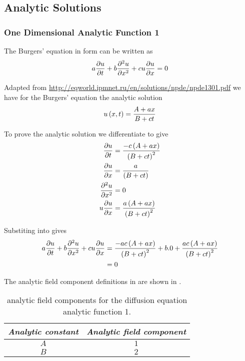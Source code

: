 \subsection{Analytic Solutions}

\subsubsection{One Dimensional Analytic Function 1}

The \oned Burgers' equation in \OpenCMISS form can be written as
\begin{equation}
  a\delby{u}{t}+b\deltwosqby{u}{x}+cu\delby{u}{x}=0
  \label{eqn:OpenCMISSBurgerEquationOneDim}
\end{equation}

Adapted from \url{http://eqworld.ipmnet.ru/en/solutions/npde/npde1301.pdf} we
have for the \oned Burgers' equation the analytic solution
\begin{equation}
  \fnof{u}{x,t}=\dfrac{A+ax}{B+ct}
  \label{eqn:AnalyticBurgersEquationOneDim1}
\end{equation}

To prove the analytic solution we differentiate  to give
\begin{align}
  \delby{u}{t} &= \dfrac{-c\pbrac{A+ax}}{\pbrac{B+ct}^{2}} \\
  \delby{u}{x} &= \dfrac{a}{\pbrac{B+ct}} \\
  \deltwosqby{u}{x} &= 0 \\
  u\delby{u}{x} &= \dfrac{a\pbrac{A+ax}}{\pbrac{B+ct}^{2}} \\
  \label{eqn:AnalyticBurgersEquationOneDim1Derivatives}
\end{align}

Substiting  into  gives
\begin{align}
  a \dfrac{\partial u}{\partial t} +b \dfrac{\partial^{2} u}{\partial {x}^{2}} +cu \dfrac{\partial u}{\partial x}  &=
  \dfrac{-ac\left( A+ax \right)}{\left( B+ct \right)^{2}}+b.0+\dfrac{ac\left( A+ax \right)}{\left( B+ct \right)^{2}}\\
  &= 0
\end{align}

The analytic field component definitions in \OpenCMISS are shown in .

\begin{table}[htb] \centering
  \begin{tabular}{|c|c|} \hline
    \emph{Analytic constant} & \emph{Analytic field component} \\ \hline \hline
    $A$ & $1$ \\ 
    $B$ & $2$ \\  \hline
  \end{tabular}
  \caption{\OpenCMISS analytic field components for the \oned diffusion equation
    analytic function 1.}
  \label{tab:OpenCMISSAnalyticFieldBurgersEquationOneDim1}
\end{table}

